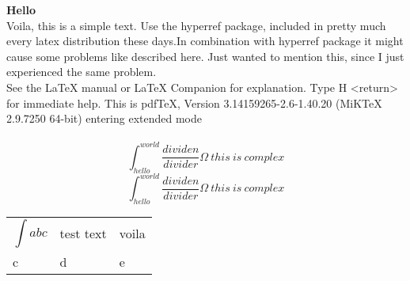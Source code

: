 \documentclass[fleqn]{minimal}
\def\chapter#1{\clearpage\pdfbookmark{#1}{id:#1}\textbf{#1}\\}
\begin{document}
\chapter{Hello}
Voila, this is a simple text.
Use the hyperref package, included in pretty much every latex distribution these days.In combination with hyperref package it might cause some problems like described here. Just wanted to mention this, since I just experienced the same problem.\\
See the LaTeX manual or LaTeX Companion for explanation.
Type  H <return>  for immediate help.
This is pdfTeX, Version 3.14159265-2.6-1.40.20 (MiKTeX 2.9.7250 64-bit)
entering extended mode\\
\\%

\[ \int_{hello}^{world}\frac{dividen}{divider} \Omega~this~is~complex \]
\[ \int_{hello}^{world}\frac{dividen}{divider} \Omega~this~is~complex \]

\newlength\q
\setlength{}
\noindent\begin{tabular}{p{\q}p{\q}p{\q}}
\[\int abc\] & test text & voila\\
c & d & e
\end{tabular}
\end{document}
